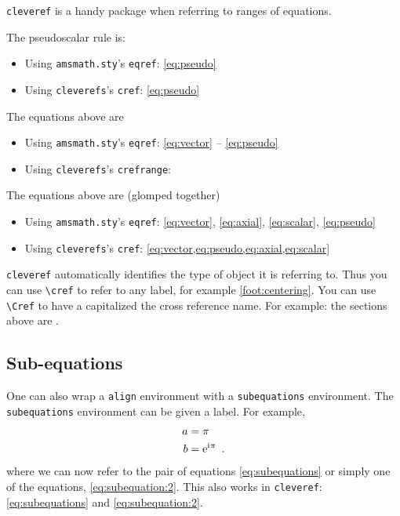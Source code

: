 \texttt{cleveref} is a handy package when referring to ranges of equations. 

The pseudoscalar rule is:
\begin{itemize}
	\item Using \texttt{amsmath.sty}'s \texttt{eqref}: \eqref{eq:pseudo}
	\item Using \texttt{cleverefs}'s \texttt{cref}: \cref{eq:pseudo}
\end{itemize}

The equations above are
\begin{itemize}
	\item Using \texttt{amsmath.sty}'s \texttt{eqref}: \eqref{eq:vector} -- \eqref{eq:pseudo}
	\item Using \texttt{cleverefs}'s \texttt{crefrange}: 
\end{itemize}

The equations above are (glomped together)
\begin{itemize}
	\item Using \texttt{amsmath.sty}'s \texttt{eqref}: \eqref{eq:vector}, \eqref{eq:axial}, \eqref{eq:scalar}, \eqref{eq:pseudo}
	\item Using \texttt{cleverefs}'s \texttt{cref}: \cref{eq:vector,eq:pseudo,eq:axial,eq:scalar}
\end{itemize}

\texttt{cleveref} automatically identifies the type of object it is referring to. Thus you can use \verb!\cref! to refer to any label, for example \cref{foot:centering}. You can use \verb!\Cref! to have a capitalized the cross reference name. For example: the sections above are .


\subsection{Sub-equations}

One can also wrap a \texttt{align} environment with a \texttt{subequations} environment. The \texttt{subequations} environment can be given a label. For example,
\begin{subequations}\label{eq:subequations}
\begin{align}
	a &= \pi 
	\label{eq:subequation:1}
	\\
	b &= \operatorname{e}^{\operatorname{i}\mkern-2mu \pi} 
	\ .
	\label{eq:subequation:2}
\end{align}
\end{subequations}
where we can now refer to the pair of equations \eqref{eq:subequations} or simply one of the equations, \eqref{eq:subequation:2}. This also works in \texttt{cleveref}: \cref{eq:subequations} and \cref{eq:subequation:2}.


